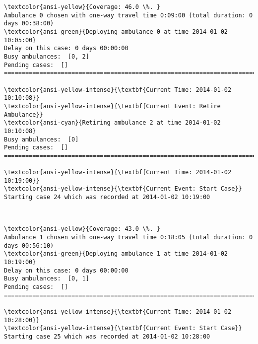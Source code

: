 \documentclass[11pt]{article}
\begin{document}
    \begin{Verbatim}[commandchars=\\\{\}]
\textcolor{ansi-yellow}{Coverage: 46.0 \%. }
Ambulance 0 chosen with one-way travel time 0:09:00 (total duration: 0 days 00:38:00)
\textcolor{ansi-green}{Deploying ambulance 0 at time 2014-01-02 10:05:00}
Delay on this case: 0 days 00:00:00
Busy ambulances:  [0, 2]
Pending cases:  []
========================================================================

\textcolor{ansi-yellow-intense}{\textbf{Current Time: 2014-01-02 10:10:08}}
\textcolor{ansi-yellow-intense}{\textbf{Current Event: Retire Ambulance}}
\textcolor{ansi-cyan}{Retiring ambulance 2 at time 2014-01-02 10:10:08}
Busy ambulances:  [0]
Pending cases:  []
========================================================================

\textcolor{ansi-yellow-intense}{\textbf{Current Time: 2014-01-02 10:19:00}}
\textcolor{ansi-yellow-intense}{\textbf{Current Event: Start Case}}
Starting case 24 which was recorded at 2014-01-02 10:19:00

    \end{Verbatim}

    \begin{center}
    \end{center}
    { \hspace*{\fill} \\}
    
    \begin{Verbatim}[commandchars=\\\{\}]
\textcolor{ansi-yellow}{Coverage: 43.0 \%. }
Ambulance 1 chosen with one-way travel time 0:18:05 (total duration: 0 days 00:56:10)
\textcolor{ansi-green}{Deploying ambulance 1 at time 2014-01-02 10:19:00}
Delay on this case: 0 days 00:00:00
Busy ambulances:  [0, 1]
Pending cases:  []
========================================================================

\textcolor{ansi-yellow-intense}{\textbf{Current Time: 2014-01-02 10:28:00}}
\textcolor{ansi-yellow-intense}{\textbf{Current Event: Start Case}}
Starting case 25 which was recorded at 2014-01-02 10:28:00

    \end{Verbatim}

    \begin{center}
    \end{center}
    { \hspace*{\fill} \\}
    
\end{document}

